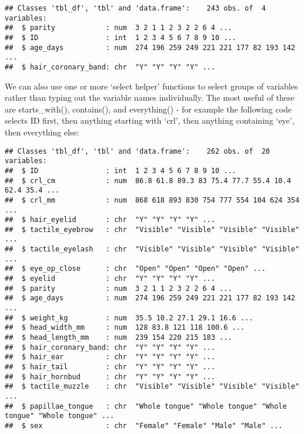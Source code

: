 \documentclass[
]{article}
\newenvironment{Shaded}{\begin{snugshade}}{\end{snugshade}}
\newcommand{\DataTypeTok}[1]{\textcolor[rgb]{0.13,0.29,0.53}{#1}}
\newcommand{\KeywordTok}[1]{\textcolor[rgb]{0.13,0.29,0.53}{\textbf{#1}}}
\newcommand{\NormalTok}[1]{#1}
\newcommand{\OperatorTok}[1]{\textcolor[rgb]{0.81,0.36,0.00}{\textbf{#1}}}
\newcommand{\StringTok}[1]{\textcolor[rgb]{0.31,0.60,0.02}{#1}}
\begin{document}
\begin{verbatim}
## Classes 'tbl_df', 'tbl' and 'data.frame':    243 obs. of  4 variables:
##  $ parity            : num  3 2 1 1 2 3 2 2 6 4 ...
##  $ ID                : int  1 2 3 4 5 6 7 8 9 10 ...
##  $ age_days          : num  274 196 259 249 221 221 177 82 193 142 ...
##  $ hair_coronary_band: chr  "Y" "Y" "Y" "Y" ...
\end{verbatim}

We can also use one or more `select helper' functions to select groups
of variables rather than typing out the variable names individually. The
most useful of these are starts\_with(), contains(), and everything() -
for example the following code selects ID first, then anything starting
with `crl', then anything containing `eye', then everything else:

\begin{Shaded}
\end{Shaded}

\begin{verbatim}
## Classes 'tbl_df', 'tbl' and 'data.frame':    262 obs. of  20 variables:
##  $ ID                : int  1 2 3 4 5 6 7 8 9 10 ...
##  $ crl_cm            : num  86.8 61.8 89.3 83 75.4 77.7 55.4 10.4 62.4 35.4 ...
##  $ crl_mm            : num  868 618 893 830 754 777 554 104 624 354 ...
##  $ hair_eyelid       : chr  "Y" "Y" "Y" "Y" ...
##  $ tactile_eyebrow   : chr  "Visible" "Visible" "Visible" "Visible" ...
##  $ tactile_eyelash   : chr  "Visible" "Visible" "Visible" "Visible" ...
##  $ eye_op_close      : chr  "Open" "Open" "Open" "Open" ...
##  $ eyelid            : chr  "Y" "Y" "Y" "Y" ...
##  $ parity            : num  3 2 1 1 2 3 2 2 6 4 ...
##  $ age_days          : num  274 196 259 249 221 221 177 82 193 142 ...
##  $ weight_kg         : num  35.5 10.2 27.1 29.1 16.6 ...
##  $ head_width_mm     : num  128 83.8 121 118 100.6 ...
##  $ head_length_mm    : num  239 154 220 215 183 ...
##  $ hair_coronary_band: chr  "Y" "Y" "Y" "Y" ...
##  $ hair_ear          : chr  "Y" "Y" "Y" "Y" ...
##  $ hair_tail         : chr  "Y" "Y" "Y" "Y" ...
##  $ hair_hornbud      : chr  "Y" "Y" "Y" "Y" ...
##  $ tactile_muzzle    : chr  "Visible" "Visible" "Visible" "Visible" ...
##  $ papillae_tongue   : chr  "Whole tongue" "Whole tongue" "Whole tongue" "Whole tongue" ...
##  $ sex               : chr  "Female" "Female" "Male" "Male" ...
\end{verbatim}
\end{document}

